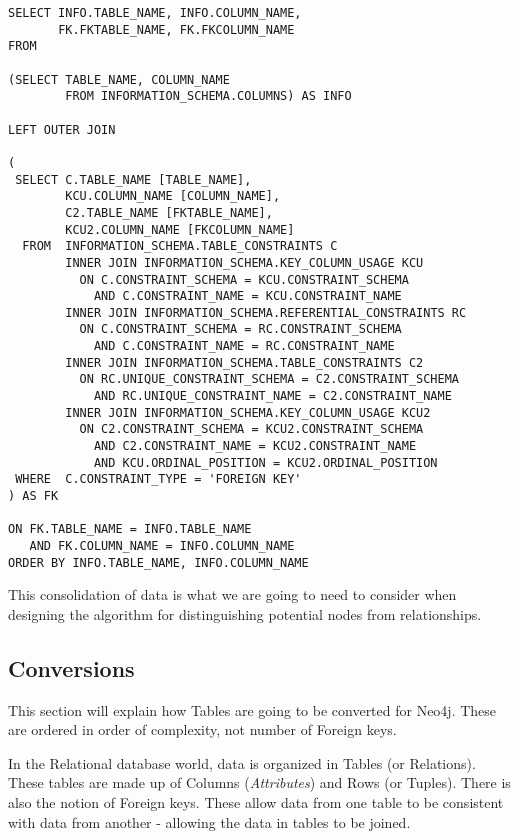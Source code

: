 \documentclass{acm_proc_article-sp}
\begin{document}
\begin{lstlisting}[frame=single,breaklines=true]
SELECT INFO.TABLE_NAME, INFO.COLUMN_NAME, 
       FK.FKTABLE_NAME, FK.FKCOLUMN_NAME 
FROM

(SELECT TABLE_NAME, COLUMN_NAME
        FROM INFORMATION_SCHEMA.COLUMNS) AS INFO

LEFT OUTER JOIN

(
 SELECT C.TABLE_NAME [TABLE_NAME], 
        KCU.COLUMN_NAME [COLUMN_NAME],
        C2.TABLE_NAME [FKTABLE_NAME], 
        KCU2.COLUMN_NAME [FKCOLUMN_NAME]
  FROM  INFORMATION_SCHEMA.TABLE_CONSTRAINTS C 
        INNER JOIN INFORMATION_SCHEMA.KEY_COLUMN_USAGE KCU 
          ON C.CONSTRAINT_SCHEMA = KCU.CONSTRAINT_SCHEMA 
            AND C.CONSTRAINT_NAME = KCU.CONSTRAINT_NAME 
        INNER JOIN INFORMATION_SCHEMA.REFERENTIAL_CONSTRAINTS RC 
          ON C.CONSTRAINT_SCHEMA = RC.CONSTRAINT_SCHEMA 
            AND C.CONSTRAINT_NAME = RC.CONSTRAINT_NAME 
        INNER JOIN INFORMATION_SCHEMA.TABLE_CONSTRAINTS C2 
          ON RC.UNIQUE_CONSTRAINT_SCHEMA = C2.CONSTRAINT_SCHEMA 
            AND RC.UNIQUE_CONSTRAINT_NAME = C2.CONSTRAINT_NAME 
        INNER JOIN INFORMATION_SCHEMA.KEY_COLUMN_USAGE KCU2 
          ON C2.CONSTRAINT_SCHEMA = KCU2.CONSTRAINT_SCHEMA 
            AND C2.CONSTRAINT_NAME = KCU2.CONSTRAINT_NAME 
            AND KCU.ORDINAL_POSITION = KCU2.ORDINAL_POSITION 
 WHERE  C.CONSTRAINT_TYPE = 'FOREIGN KEY'
) AS FK

ON FK.TABLE_NAME = INFO.TABLE_NAME
   AND FK.COLUMN_NAME = INFO.COLUMN_NAME
ORDER BY INFO.TABLE_NAME, INFO.COLUMN_NAME
\end{lstlisting}

This consolidation of data is what we are going to need to consider when
designing the algorithm for distinguishing potential nodes from relationships.

\subsection{Conversions}

This section will explain how Tables are going to be converted for 
Neo4j. These are ordered in order of complexity, not number of
Foreign keys.

In the Relational database world, data is organized in Tables (or Relations). These tables are made up of Columns (\textit{Attributes}) and Rows (or Tuples). There is also the notion of Foreign keys. These allow data from one table to be consistent with data from another - allowing the data in tables to be joined.
\end{document}
